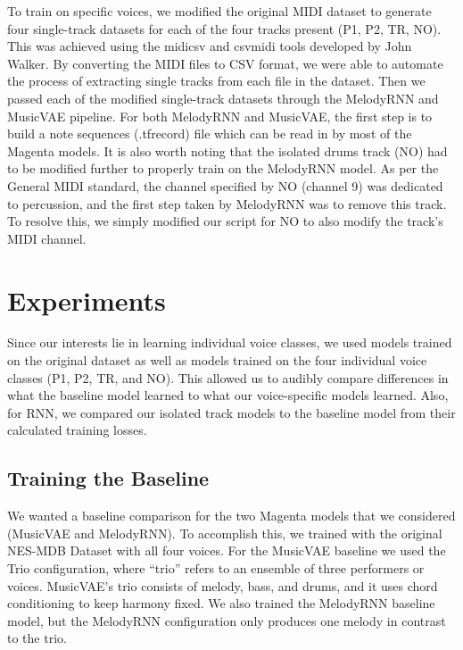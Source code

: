 \documentclass{article}
\begin{document}
To train on specific voices, we modified the original MIDI dataset to generate four single-track datasets for each of the four tracks present (P1, P2, TR, NO). This was achieved using the midicsv and csvmidi tools developed by John Walker. By converting the MIDI files to CSV format, we were able to automate the process of extracting single tracks from each file in the dataset. Then we passed each of the modified single-track datasets through the MelodyRNN and MusicVAE pipeline. For both MelodyRNN and MusicVAE, the first step is to build a note sequences (.tfrecord) file which can be read in by most of the Magenta models. It is also worth noting that the isolated drums track (NO) had to be modified further to properly train on the MelodyRNN model. As per the General MIDI standard, the channel specified by NO (channel 9) was dedicated to percussion, and the first step taken by MelodyRNN was to remove this track. To resolve this, we simply modified our script for NO to also modify the track’s MIDI channel.


\section{Experiments}


Since our interests lie in learning individual voice classes, we used models trained on the original dataset as well as models trained on the four individual voice classes (P1, P2, TR, and NO). This allowed us to audibly compare differences in what the baseline model learned to what our voice-specific models learned. Also, for RNN, we compared our isolated track models to the baseline model from their calculated training losses.

\subsection{Training the Baseline}
We wanted a baseline comparison for the two Magenta models that we considered (MusicVAE and MelodyRNN). To accomplish this, we trained with the original NES-MDB Dataset with all four voices. For the MusicVAE baseline we used the Trio configuration, where “trio” refers to an ensemble of three performers or voices. MusicVAE’s trio consists of melody, bass, and drums, and it uses chord conditioning to keep harmony fixed. We also trained the MelodyRNN baseline model, but the MelodyRNN configuration only produces one melody in contrast to the trio.
\end{document}
